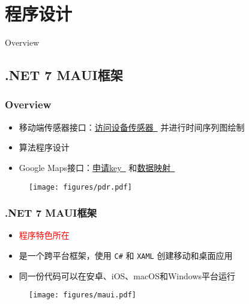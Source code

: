 \documentclass[10pt,xcolor=dvipsnames,fontset=none,punct=CCT]{ctexbeamer}
\begin{document}
\section{程序设计}
\begin{frame}{Overview}
\end{frame}

\subsection{.NET 7 MAUI框架}
\begin{frame}
  \frametitle{Overview}
  \begin{itemize}
    \item 移动端传感器接口：\href{https://learn.microsoft.com/zh-cn/dotnet/maui/platform-integration/device/sensors?view=net-maui-7.0\&tabs=android\#orientation}{访问设备传感器\ \faWindows} 并进行时间序列图绘制
    \item 算法程序设计
    \item Google Maps接口：\href{https://developers.google.com/maps/documentation/android-sdk/get-api-key?hl=zh-cn}{申请key\ \faGoogle} 和\href{https://learn.microsoft.com/zh-cn/dotnet/maui/user-interface/controls/map?view=net-maui-7.0}{数据映射\ \faWindows}
  \end{itemize}
  \begin{figure}[ht]
    \centering
    \texttt{[image: figures/pdr.pdf]}
  \end{figure}
\end{frame}

\begin{frame}[fragile]
  \frametitle{.NET 7 MAUI框架}
  \begin{itemize}
    \item \textcolor{red}{程序特色所在}
    \item 是一个跨平台框架，使用 \texttt{C#} 和 \texttt{XAML} 创建移动和桌面应用
    \item 同一份代码可以在安卓、iOS、macOS和Windows平台运行
  \end{itemize}
  \begin{figure}
    \centering
    \texttt{[image: figures/maui.pdf]}
  \end{figure}
\end{frame}
\end{document}

